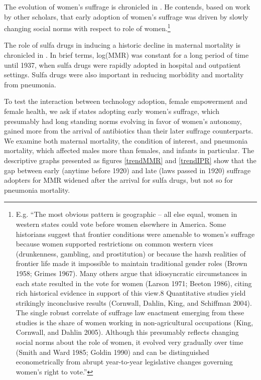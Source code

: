 \documentclass[11pt]{article}
\begin{document}
\begin{spacing}{1.4}
The evolution of women's suffrage is chronicled in \citet{miller2008women}. He 
contends, based on work by other scholars, that early adoption of women's 
suffrage was driven by slowly changing social norms with respect to role of 
women.\footnote{E.g. ``The most obvious pattern is geographic – all else equal, 
women in western states could vote before women elsewhere in America. Some 
historians suggest that frontier conditions were amenable to women's suffrage 
because women supported restrictions on common western vices (drunkenness, 
gambling, and prostitution) or because the harsh realities of frontier life made 
it impossible to maintain traditional gender roles (Brown 1958; Grimes 1967). 
Many others argue that idiosyncratic circumstances in each state resulted in the 
vote for women (Larson 1971; Beeton 1986), citing rich historical evidence in 
support of this view.8 Quantitative studies yield strikingly inconclusive results 
(Cornwall, Dahlin, King, and Schiffman 2004). The single robust correlate of 
suffrage law enactment emerging from these studies is the share of women working 
in non-agricultural occupations (King, Cornwall, and Dahlin 2005). Although 
this presumably reflects changing social norms about the role of women, it 
evolved very gradually over time (Smith and Ward 1985; Goldin 1990) and can be 
distinguished econometrically from abrupt year-to-year legislative changes 
governing women's right to vote.''}  

The role of sulfa drugs in inducing a historic decline in maternal mortality is 
chronicled in \citet{jayachandran2008mortality}. In brief terms, log(MMR) was 
constant for a long period of time until 1937, when sulfa drugs were rapidly 
adopted in hospital and outpatient settings. Sulfa drugs were also important in 
reducing morbidity and mortality from pneumonia.

To test the interaction between technology adoption, female empowerment and female
health, we ask if states adopting early women's suffrage, which presumably had long 
standing norms evolving in favor of women's autonomy, gained more from the arrival 
of antibiotics than their later suffrage counterparts. We examine both maternal 
mortality, the condition of interest, and pneumonia mortality, which affected males 
more than females, and infants in particular. The descriptive graphs presented as
figures \ref{trendMMR} and \ref{trendIPR} show that the gap between early (anytime 
before 1920) and late (laws passed in 1920) suffrage adopters for MMR widened after 
the arrival for sulfa drugs, but not so for pneumonia mortality.



\end{spacing}
\end{document}
